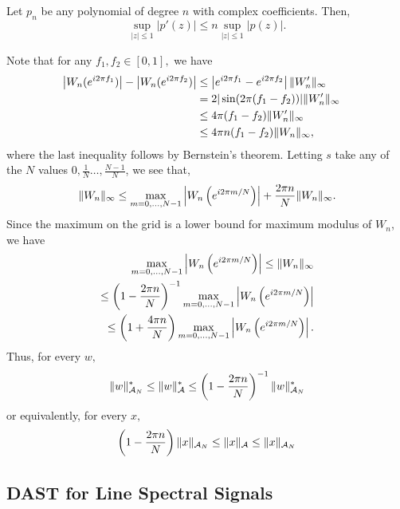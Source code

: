 \begin{theorem}
Let $p_n$ be any polynomial of degree $n$ with complex coefficients. Then,
\begin{equation*}
 \sup_{|z|\leq 1} |p'(z)|  \leq n  \sup_{|z|\leq 1} |p(z)|.
\end{equation*}
\end{theorem}
Note that for any $f_1, f_2 \in [0,1],$ we have
\begin{align*}
  \left|W_n(e^{i2\pi f_1})\right| - \left|W_n(e^{i2\pi f_2})\right|  &\leq   \left|e^{i2\pi f_1} - e^{i2\pi f_2}\right| \lVert W_n'\rVert_\infty&&\\
  &= 2|\sin(2\pi (f_1-f_2))| \lVert W_n'\rVert_\infty\\
  &\leq 4 \pi (f_1-f_2) \lVert W_n'\rVert_\infty\label{diff}\\
  & \leq 4 \pi n (f_1-f_2) \lVert W_n\rVert_\infty,
\end{align*}
where the last inequality follows by Bernstein's theorem.
Letting $s$ take any of the $N$ values $0,\tfrac{1}{N} \ldots, \tfrac{N-1}{N}$, we see that,
\begin{equation*}
\lVert W_n\rVert_\infty \leq \max_{m=0,\ldots,N-1}\left| W_n\left(e^{i 2 \pi m/N}\right) \right| + \frac{2\pi n}{N}\lVert W_n\rVert_\infty.
\end{equation*}
Since the maximum on the grid is a lower bound for maximum modulus of $W_n$, we have
\begin{align}
\max_{m=0,\ldots,N-1} \left| W_n\left(e^{i 2 \pi m/N}\right) \right| \leq \lVert W_n\rVert_\infty \\
\leq  \left(1-\frac{2\pi n}{N}\right)^{-1} \max_{m=0,\ldots,N-1} \left| W_n\left(e^{i 2 \pi m/N}\right) \right|\nonumber\\
 \leq  \left(1+\frac{4\pi n}{N}\right) \max_{m=0,\ldots,N-1} \left| W_n\left(e^{i 2 \pi m/N}\right) \right|.
\label{eq:grid-approx}
\end{align}
Thus, for every $w,$
\begin{equation}
\lVert w\rVert_{\mathcal{A}_N}^* \leq  \lVert w\rVert_{\mathcal{A}}^* \leq  \left(1-\frac{2\pi n}{N}\right)^{-1} \lVert w\rVert_{\mathcal{A}_N}^*
\end{equation}
or equivalently, for every $x,$
\begin{equation}
 \left(1-\frac{2\pi n}{N}\right) \lVert x\rVert_{\mathcal{A}_N} \leq  \lVert x\rVert_{\mathcal{A}} \leq \lVert x\rVert_{\mathcal{A}_N}
\end{equation}

\subsection{DAST for Line Spectral Signals}\label{sec:comp-method}

